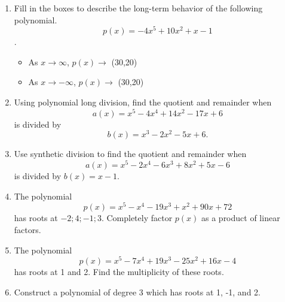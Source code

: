 \documentclass{article}
\begin{document}
\ActivityTitle[class={College Algebra}, number={3}, name={Polynomials 1}]

\begin{enumerate}
\item Fill in the boxes to describe the long-term behavior of the following polynomial. \[ p(x) = -4x^5 + 10x^2 + x - 1 \].

\begin{itemize}
\item As $x \rightarrow \infty$, $p(x) \rightarrow$ \framebox(30,20){} \vspace{0.5cm}
\item As $x \rightarrow -\infty$, $p(x) \rightarrow$ \framebox(30,20){}
\end{itemize} \vspace{1cm}

\item Using polynomial long division, find the quotient and remainder when \[ a(x) = x^5 - 4x^4 + 14x^2 - 17x + 6 \] is divided by \[ b(x) = x^3 - 2x^2 - 5x + 6. \] \vspace{6cm}

\item Use synthetic division to find the quotient and remainder when \[ a(x) = x^5 - 2x^4 - 6x^3 + 8x^2 + 5x - 6 \] is divided by $b(x) = x - 1$. \vspace{3cm}

\newpage

\item The polynomial \[ p(x) = x^5 - x^4 - 19x^3 + x^2 + 90x + 72 \] has roots at ${-2;4;-1;3}$. Completely factor $p(x)$ as a product of linear factors. \vspace{7cm}

\item The polynomial \[ p(x) = x^5 - 7x^4 + 19x^3 - 25x^2 + 16x - 4 \] has roots at 1 and 2. Find the multiplicity of these roots. \vspace{7cm}

\item Construct a polynomial of degree 3 which has roots at 1, -1, and 2. \vspace{7cm}
\end{enumerate}
\end{document}
